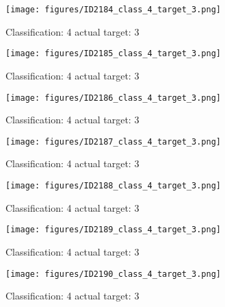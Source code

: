 \begin{figure}[h!]
\begin{center}
\texttt{[image: figures/ID2184\_class\_4\_target\_3.png]}
\end{center}
\caption{ Classification: 4 actual target: 3}
\label{fig:ID2184_class_4_target_3}
\end{figure}
\begin{figure}[h!]
\begin{center}
\texttt{[image: figures/ID2185\_class\_4\_target\_3.png]}
\end{center}
\caption{ Classification: 4 actual target: 3}
\label{fig:ID2185_class_4_target_3}
\end{figure}
\begin{figure}[h!]
\begin{center}
\texttt{[image: figures/ID2186\_class\_4\_target\_3.png]}
\end{center}
\caption{ Classification: 4 actual target: 3}
\label{fig:ID2186_class_4_target_3}
\end{figure}
\begin{figure}[h!]
\begin{center}
\texttt{[image: figures/ID2187\_class\_4\_target\_3.png]}
\end{center}
\caption{ Classification: 4 actual target: 3}
\label{fig:ID2187_class_4_target_3}
\end{figure}
\begin{figure}[h!]
\begin{center}
\texttt{[image: figures/ID2188\_class\_4\_target\_3.png]}
\end{center}
\caption{ Classification: 4 actual target: 3}
\label{fig:ID2188_class_4_target_3}
\end{figure}
\begin{figure}[h!]
\begin{center}
\texttt{[image: figures/ID2189\_class\_4\_target\_3.png]}
\end{center}
\caption{ Classification: 4 actual target: 3}
\label{fig:ID2189_class_4_target_3}
\end{figure}
\begin{figure}[h!]
\begin{center}
\texttt{[image: figures/ID2190\_class\_4\_target\_3.png]}
\end{center}
\caption{ Classification: 4 actual target: 3}
\label{fig:ID2190_class_4_target_3}
\end{figure}
